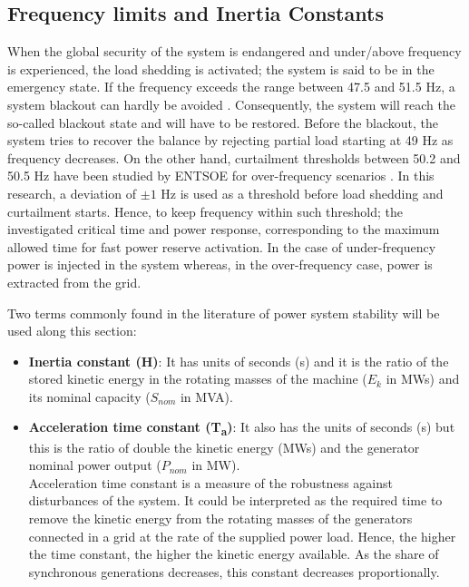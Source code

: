 \subsection{Frequency limits and Inertia Constants}
When the global security of the system is endangered and under/above frequency is experienced, the load shedding is activated; the system is said to be in the emergency state. If the frequency exceeds the range between 47.5 and 51.5 Hz, a system blackout can hardly be avoided \cite{ENTSOE.2016}. Consequently, the system will reach the so-called blackout state and will have to be restored. Before the blackout, the system tries to recover the balance by rejecting partial load starting at 49 Hz as frequency decreases. On the other hand, curtailment thresholds between 50.2 and 50.5 Hz have been studied by ENTSOE for over-frequency scenarios \cite{ENTSOE.2016}. In this research, a deviation of $ \pm1 $ Hz is used as a threshold before load shedding and curtailment starts. Hence, to keep frequency within such threshold; the investigated critical time and power response, corresponding to the maximum allowed time for fast power reserve activation. In the case of under-frequency power is injected in the system whereas, in the over-frequency case, power is extracted from the grid.

Two terms commonly found in the literature of power system stability will be used along this section:

\begin{itemize}[leftmargin=*,labelsep=5.8mm]
	\item \textbf{Inertia constant (H)}: It has units of seconds (s) and it is the ratio of the stored kinetic energy in the rotating masses of the machine ($E_k$ in MWs) and its nominal capacity ($S_{nom}$ in MVA).\\
	\item \textbf{Acceleration time constant (T\textsubscript{a})}: It also has the units of seconds (s) but this is the ratio of double the kinetic energy (MWs) and the generator nominal power output ($P_{nom}$ in MW).\\
	Acceleration time constant is a measure of the robustness against disturbances of the system. It could be interpreted as the required time to remove the kinetic energy from the rotating masses of the generators connected in a grid at the rate of the supplied power load. Hence, the higher the time constant, the higher the kinetic energy available. As the share of synchronous generations decreases, this constant decreases proportionally.
\end{itemize}

